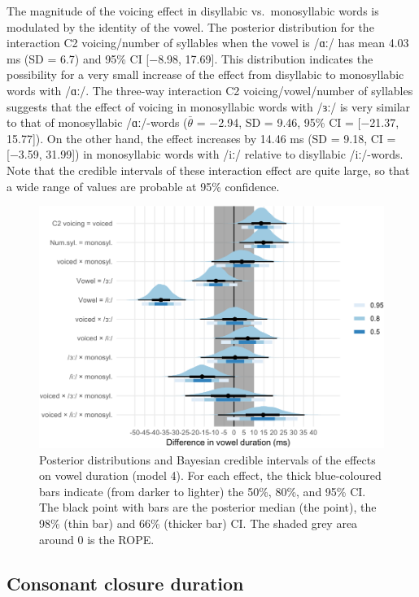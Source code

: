 \documentclass[
  12pt,
  a4paper,
]{article}
\begin{document}
The magnitude of the voicing effect in disyllabic vs.~monosyllabic words
is modulated by the identity of the vowel. The posterior distribution
for the interaction C2 voicing/number of syllables when the vowel is
/ɑː/ has mean 4.03 ms (SD = 6.7) and 95\% CI {[}−8.98, 17.69{]}. This
distribution indicates the possibility for a very small increase of the
effect from disyllabic to monosyllabic words with /ɑː/. The three-way
interaction C2 voicing/vowel/number of syllables suggests that the
effect of voicing in monosyllabic words with /ɜː/ is very similar to
that of monosyllabic /ɑː/-words (\(\bar{\theta}\) = −2.94, SD = 9.46,
95\% CI = {[}−21.37, 15.77{]}). On the other hand, the effect increases
by 14.46 ms (SD = 9.18, CI = {[}−3.59, 31.99{]}) in monosyllabic words
with /iː/ relative to disyllabic /iː/-words. Note that the credible
intervals of these interaction effect are quite large, so that a wide
range of values are probable at 95\% confidence.

\begin{figure}
\includegraphics[width=\linewidth]{2019-english-rr_files/figure-latex/vow-4-intervals-1} \caption{Posterior distributions and Bayesian credible intervals of the effects on vowel duration (model 4). For each effect, the thick blue-coloured bars indicate (from darker to lighter) the 50\%, 80\%, and 95\% CI. The black point with bars are the posterior median (the point), the 98\% (thin bar) and 66\% (thicker bar) CI. The shaded grey area around 0 is the ROPE.}\label{f:vow-4-intervals}
\end{figure}

\hypertarget{consonant-closure-duration}{%
\subsection{Consonant closure
duration}\label{consonant-closure-duration}}
\end{document}
